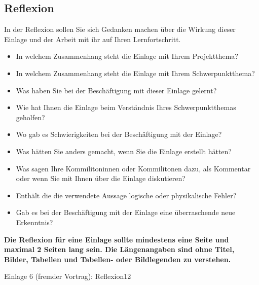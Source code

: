 \subsection{Reflexion}
\begin{hinweise}
In der Reflexion sollen Sie sich Gedanken machen über die Wirkung dieser Einlage und der Arbeit mit ihr auf
Ihren Lernfortschritt.
\begin{itemize}\itemsep0pt
\item In welchem Zusammenhang steht die Einlage mit Ihrem Projektthema?
\item In welchem Zusammenhang steht die Einlage mit Ihrem Schwerpunktthema?
\item Was haben Sie bei der Beschäftigung mit dieser Einlage gelernt?
\item Wie hat Ihnen die Einlage beim Verständnis Ihres Schwerpunktthemas geholfen?
\item Wo gab es Schwierigkeiten bei der Beschäftigung mit der Einlage?
\item Was hätten Sie anders gemacht, wenn Sie die Einlage erstellt hätten?
\item Was sagen Ihre Kommilitoninnen oder Kommilitonen dazu, als Kommentar oder wenn Sie mit Ihnen über die Einlage diskutieren?
\item Enthält die die verwendete Aussage logische oder physikalische Fehler?
\item Gab es bei der Beschäftigung mit der Einlage eine überraschende neue Erkenntnis?
\end{itemize}
\textbf{Die Reflexion für eine Einlage sollte mindestens eine Seite und maximal 2 Seiten lang sein. Die
Längenangaben sind ohne Titel, Bilder, Tabellen und Tabellen- oder Bildlegenden zu verstehen.}
\end{hinweise}
\begin{umfang}{Einlage 6 (fremder Vortrag): Reflexion}{1}{2}
\end{umfang}

